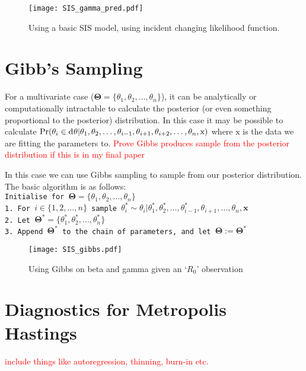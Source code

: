 \begin{figure}[htbp]
    \centering
    \texttt{[image: SIS\_gamma\_pred.pdf]}
    \caption{Using a basic SIS model, using incident changing likelihood function.}
    \label{fig:SIS_MH_R}
\end{figure}

\section{Gibb's Sampling}

For a multivariate case ($\mathbf{\Theta} = \{\theta_1, \theta_2, \dots, \theta_n\}$), it can be analytically or computationally intractable to calculate the posterior (or even something proportional to the posterior) distribution. In this case it may be possible to calculate $\Pr(\theta_i\in\diff\theta|\theta_1, \theta_2, \dots, \theta_{i - 1}, \theta_{i+1}, \theta_{i+2}, \dots, \theta_n, \mathrm{x})$ where $\mathrm{x}$ is the data we are fitting the parameters to.
\textcolor{red}{Prove Gibbs produces sample from the posterior distribution if this is in my final paper}

In this case we can use Gibbs sampling to sample from our posterior distribution. The basic algorithm is as follows:
\texttt{\\
    Initialise for $\mathbf{\Theta} = \{\theta_1, \theta_2, \dots, \theta_n\}$\\
    1. For $i\in\{1, 2, \dots, n\}$ sample $\theta_i^* \sim \theta_i|\theta_1^*, \theta_2^*, \dots, \theta_{i-1}^*, \theta_{i+1}, \dots, \theta_n, \mathbf{x}$\\
    2. Let $\mathbf{\Theta}^* = \{\theta_1^*, \theta_2^*, \dots, \theta_n^*\}$\\
    3. Append $\mathbf{\Theta}^*$ to the chain of parameters, and let $\mathbf{\Theta} := \mathbf{\Theta}^*$
}


\begin{figure}[htbp]
    \centering
    \texttt{[image: SIS\_gibbs.pdf]}
    \caption{Using Gibbs on beta and gamma given an `$R_0$' observation}
    \label{fig:gibbs_R}
\end{figure}

\section{Diagnostics for Metropolis Hastings}
\textcolor{red}{include things like autoregression, thinning, burn-in etc.}